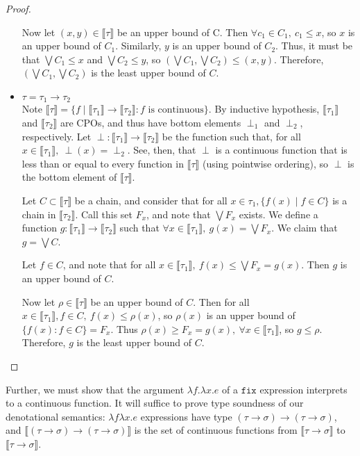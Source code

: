 \begin{proof}
\begin{itemize}
Now let $(x,y) \in \llbracket \tau \rrbracket$ be an upper bound of C. Then $\forall c_1 \in C_1, \ c_1 \leq x$, so $x$ is an upper 
bound of $C_1$. Similarly, $y$ is an upper bound of $C_2$. Thus, it must be that $\bigvee C_1 \leq x$ and 
$\bigvee C_2 \leq y$, so $(\bigvee C_1, \bigvee C_2) \leq (x,y)$. Therefore, $(\bigvee C_1, \bigvee C_2)$ is the least upper
bound of $C$.

\item $\tau = \tau_1 \rightarrow \tau_2$ \\ 
Note $\llbracket \tau \rrbracket = \{f \mid \llbracket \tau_1 \rrbracket \rightarrow \llbracket \tau_2 \rrbracket : f \text{ is continuous}\}
$. By inductive hypothesis, $\llbracket \tau_1 \rrbracket$ and $\llbracket \tau_2 \rrbracket$ are CPOs, and thus have bottom
elements $\perp_1$ and $\perp_2$, respectively. Let $\perp: \llbracket \tau_1 \rrbracket \rightarrow \llbracket \tau_2 
\rrbracket$ be the function such that, for all $ x \in \llbracket \tau_1 \rrbracket, \ \perp(x) = \perp_2$. See, then, that 
$\perp$ is a continuous function that is less than or equal to every function in $\llbracket \tau \rrbracket$ (using pointwise
ordering), so $\perp$ is the bottom element of $\llbracket \tau \rrbracket$.  

Let $C \subset \llbracket \tau \rrbracket$ be a 
chain, and consider that for all $ x \in \tau_1, \{f(x) \mid f \in C\}$ is a chain in $\llbracket \tau_2 \rrbracket$. Call this set $F_x$,
and note that $\bigvee F_x$ exists. We define a function $g: \llbracket \tau_1 \rrbracket \rightarrow \llbracket \tau_2 \rrbracket$ 
such that $\forall x \in \llbracket \tau_1 \rrbracket, \ g(x) = \bigvee F_x$. We claim that $g = \bigvee C$. 

Let $f \in C$, and note that for all $ x \in \llbracket \tau_1 \rrbracket, \ f(x) \leq \bigvee F_x =g(x)$. Then $g$ is an upper bound of $C$.

Now let $\rho \in \llbracket \tau \rrbracket$ be an upper bound of $C$. Then for all $ x \in \llbracket \tau_1 \rrbracket, f \in C, \ f(x) \leq \rho(x)$, so $\rho(x)$ is an upper bound of $\{f(x) : f \in C\} = F_x$. Thus $\rho(x) \geq F_x = g(x), \ \forall x \in 
\llbracket \tau_1 \rrbracket$, so $g \leq \rho$. Therefore, $g$ is the least upper bound of $C$.
\end{itemize} 
\end{proof}
%

Further, we must show that the argument $\lambda f.\lambda x.e$ of a $\texttt{fix}$ expression interprets to a continuous function. It will suffice to prove type
soundness of our denotational semantics: $\lambda f\lambda x.e$ expressions have type $(\tau \rightarrow \sigma) \rightarrow (\tau \rightarrow \sigma)$, and 
$\llbracket (\tau \rightarrow \sigma) \rightarrow (\tau \rightarrow \sigma) \rrbracket$ is the set of continuous functions from $\llbracket \tau \rightarrow \sigma \rrbracket$ to
$\llbracket \tau \rightarrow \sigma \rrbracket$. 

